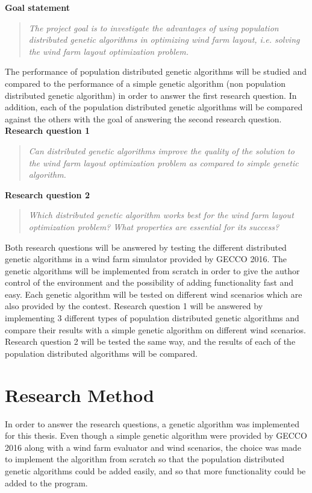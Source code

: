 \noindent \textbf{Goal statement}

\begin{quote}
\textit{The project goal is to investigate the advantages of using population distributed genetic algorithms in optimizing wind farm layout, i.e. solving the wind farm layout optimization problem.} \citep{Samorani}
\end{quote}

\noindent The performance of population distributed genetic algorithms will be studied and compared to the performance of a simple genetic algorithm (non population distributed genetic algorithm) in order to answer the first research question. In addition, each of the population distributed genetic algorithms will be compared against the others with the goal of answering the second research question. \\

\noindent \textbf{Research question 1}

\begin{quote}
\textit{Can distributed genetic algorithms improve the quality of the solution to the wind farm layout optimization problem as compared to simple genetic algorithm.}
\end{quote}

\noindent \textbf{Research question 2}

\begin{quote}
\textit{Which distributed genetic algorithm works best for the wind farm layout optimization problem? What properties are essential for its success?}
\end{quote}

\noindent Both research questions will be answered by testing the different distributed genetic algorithms in a wind farm simulator provided by GECCO 2016. The genetic algorithms will be implemented from scratch in order to give the author control of the environment and the possibility of adding functionality fast and easy. Each genetic algorithm will be tested on different wind scenarios which are also provided by the contest. Research question 1 will be answered by implementing 3 different types of population distributed genetic algorithms and compare their results with a simple genetic algorithm on different wind scenarios. Research question 2 will be tested the same way, and the results of each of the population distributed algorithms will be compared.


\section{Research Method}\label{section:researchmethod}
In order to answer the research questions, a genetic algorithm was implemented for this thesis. Even though a simple genetic algorithm were provided by GECCO 2016 along with a wind farm evaluator and wind scenarios, the choice was made to implement the algorithm from scratch so that the population distributed genetic algorithms could be added easily, and so that more functionality could be added to the program. \\

